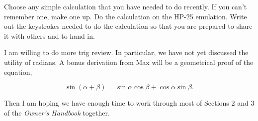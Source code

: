 Choose any simple calculation that you have needed to do recently. If you can't remember one, make one up. Do the calculation on the HP-25 emulation. Write out the keystrokes needed to do the calculation so that you are prepared to share it with others and to hand in.

\bigskip

\nobreak\bigskip

\noindent I am willing to do more trig review. In particular, we have not yet discussed the utility of radians. A bonus derivation from Max will be a geometrical proof of the equation,

$$\sin(\alpha + \beta) = \sin \alpha \cos \beta + \cos \alpha \sin \beta.$$

\noindent Then I am hoping we have enough time to work through most of Sections 2 and 3 of the {\it Owner's Handbook} together.

\noindent 
\bye
